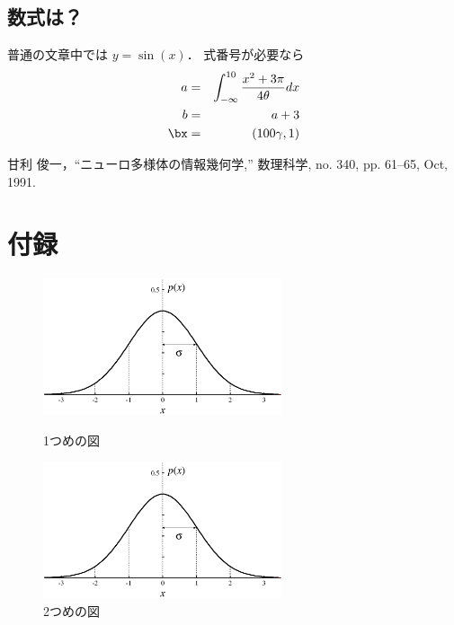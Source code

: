 \documentclass[a4paper,11pt]{jarticle}
\begin{document}
\vspace*{-10mm}

\subsection{数式は？}
普通の文章中では $ y = \sin (x)$． 式番号が必要なら
\begin{eqnarray}
a &= & \int_{-\infty}^{10}  \frac{x^2+3 \pi}{4\theta} dx \\
b & = & a + 3 \\
\bx & = & (100 \gamma, 1) \nonumber 
\end{eqnarray}

%
%
%
%

\begin{thebibliography}{99}  %

甘利 俊一，``ニューロ多様体の情報幾何学,'' 
数理科学, no. 340, pp. 61--65, Oct, 1991.

\end{thebibliography}



\section*{付録}

\begin{figure}[htbp]
 \begin{minipage}{0.5\hsize}
  \begin{center}
   \includegraphics[width=70mm]{gauss001.eps}
  \end{center}
  \caption{1つめの図}
  \label{fig:one}
 \end{minipage}
 \begin{minipage}{0.5\hsize}
  \begin{center}
   \includegraphics[width=70mm]{gauss001.eps}
  \end{center}
  \caption{2つめの図}
  \label{fig:two}
 \end{minipage}
\end{figure}
\end{document}
